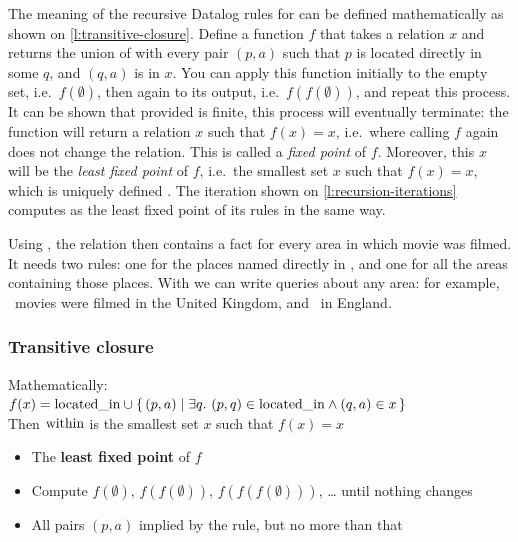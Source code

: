 The meaning of the recursive Datalog rules for  can be defined mathematically as shown on \autoref{l:transitive-closure}.
Define a function $f$ that takes a relation $x$ and returns the union of  with every pair $(p, a)$ such that $p$ is located directly in some $q$, and $(q, a)$ is in $x$.
You can apply this function initially to the empty set, i.e.\ $f(\emptyset)$, then again to its output, i.e.\ $f(f(\emptyset))$, and repeat this process.
It can be shown that provided  is finite, this process will eventually terminate: the function will return a relation $x$ such that $f(x) = x$, i.e.\ where calling $f$ again does not change the relation.
This is called a \emph{fixed point} of $f$.
Moreover, this $x$ will be the \emph{least fixed point} of $f$, i.e.\ the smallest set $x$ such that $f(x) = x$, which is uniquely defined \citep{Ceri1989,Green2013}.
The iteration shown on \autoref{l:recursion-iterations} computes  as the least fixed point of its rules in the same way.

Using , the relation  then contains a fact for every area  in which movie  was filmed.
It needs two rules: one for the places named directly in , and one for all the areas containing those places.
With  we can write queries about any area: for example, \recukmovies\ movies were filmed in the United Kingdom, and \recenglandmovies\ in England.

\begin{frame}
    \label{s:transitive-closure}
    \frametitle{Transitive closure}
    \vspace{0.3em}\pause
    Mathematically:\\
    {\footnotesize
    $f(x) = \mathrm{located\_in} \cup \{\, (p, a) \mid \exists q.\ (p, q) \in \mathrm{located\_in} \wedge (q, a) \in x \,\}$}\\[0.3em]
    Then $\mathrm{within}$ is the smallest set $x$ such that $f(x) = x$
    \begin{itemize}
        \item The \textbf{least fixed point} of $f$\pause
        \item Compute $f(\emptyset)$, $f(f(\emptyset))$, $f(f(f(\emptyset)))$, \dots{} until nothing changes
        \item All pairs $(p,a)$ implied by the rule, but no more than that
    \end{itemize}
\end{frame}
\label{l:transitive-closure}

